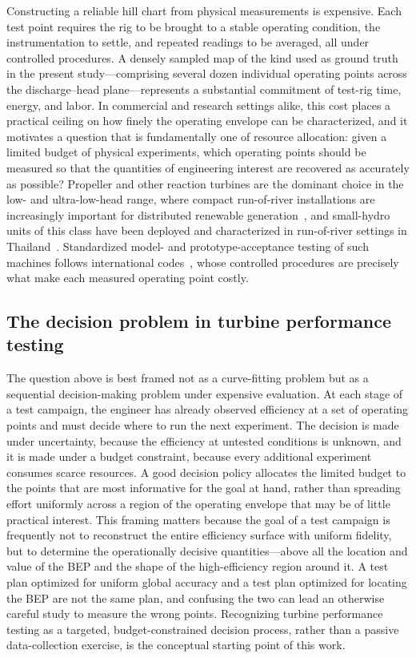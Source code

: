 \documentclass[preprint,12pt]{elsarticle}
\begin{document}
Constructing a reliable hill chart from physical measurements is expensive. Each
test point requires the rig to be brought to a stable operating condition, the
instrumentation to settle, and repeated readings to be averaged, all under
controlled procedures. A densely sampled map of the kind used as ground truth in the
present study---comprising several dozen individual operating points across the
discharge--head plane---represents a substantial commitment of test-rig time,
energy, and labor. In commercial and research settings alike, this cost places a
practical ceiling on how finely the operating envelope can be characterized, and it
motivates a question that is fundamentally one of resource allocation: given a
limited budget of physical experiments, which operating points should be measured so
that the quantities of engineering interest are recovered as accurately as possible?
Propeller and other reaction turbines are the dominant choice in the low- and
ultra-low-head range, where compact run-of-river installations are increasingly
important for distributed renewable generation~\cite{zhou2017ultralowhead}, and
small-hydro units of this class have been deployed and characterized in
run-of-river settings in Thailand~\cite{phitaksurachai2017performance}. Standardized
model- and prototype-acceptance testing of such machines follows international
codes~\cite{iec60193}, whose controlled procedures are precisely what make each
measured operating point costly.

\subsection{The decision problem in turbine performance testing}
The question above is best framed not as a curve-fitting problem but as a sequential
decision-making problem under expensive evaluation. At each stage of a test
campaign, the engineer has already observed efficiency at a set of operating points
and must decide where to run the next experiment. The decision is made under
uncertainty, because the efficiency at untested conditions is unknown, and it is
made under a budget constraint, because every additional experiment consumes scarce
resources. A good decision policy allocates the limited budget to the points that
are most informative for the goal at hand, rather than spreading effort uniformly
across a region of the operating envelope that may be of little practical interest.
This framing matters because the goal of a test campaign is frequently not to
reconstruct the entire efficiency surface with uniform fidelity, but to determine
the operationally decisive quantities---above all the location and value of the BEP
and the shape of the high-efficiency region around it. A test plan optimized for
uniform global accuracy and a test plan optimized for locating the BEP are not the
same plan, and confusing the two can lead an otherwise careful study to measure the
wrong points. Recognizing turbine performance testing as a targeted,
budget-constrained decision process, rather than a passive data-collection exercise,
is the conceptual starting point of this work.
\end{document}
